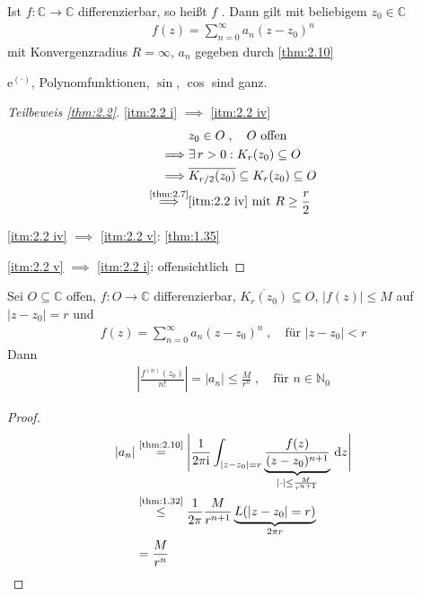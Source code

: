 \begin{theorem}[Definition] \label{thm:2.11}
  Ist $f:\mathbb{C} \to \mathbb{C}$ differenzierbar, so heißt $f$ . Dann gilt mit beliebigem $z_0 \in \mathbb{C}$
  \begin{align*}
    f(z) = \sum\limits_{n=0}^{\infty} a_n (z-z_0)^n
  \end{align*}
  mit Konvergenzradius $R = \infty$, $a_n$ gegeben durch \ref{thm:2.10}
\end{theorem}

\begin{example}
  $\mathrm{e}^{(\cdot)}$, Polynomfunktionen, $\sin$, $\cos$ sind ganz.
\end{example}

\begin{proof}[Teilbeweis \ref{thm:2.2}]
  \ref{itm:2.2 i} $\implies$ \ref{itm:2.2 iv}
  \begin{align*}
    & z_0 \in O \; , \quad O \text{ offen} \\
    \implies& \exists \, r > 0 : K_r(z_0) \subseteq O \\
    \implies& \overline{K_{r/2}(z_0)} \subseteq K_r(z_0) \subseteq O \\
    \overset{\text{\ref{thm:2.7}}}{\implies}& \text{\ref{itm:2.2 iv}} \text{ mit } R \geq \frac{r}{2}
  \end{align*}
  
  \ref{itm:2.2 iv} $\implies$ \ref{itm:2.2 v}: \ref{thm:1.35}
  
  \ref{itm:2.2 v} $\implies$ \ref{itm:2.2 i}: offensichtlich
\end{proof}

\begin{theorem} \label{thm:2.13}
  Sei $O \subseteq \mathbb{C}$ offen, $f:O \to \mathbb{C}$ differenzierbar, $\overline{K_r(z_0)} \subseteq O$, $|f(z)| \leq M$ auf $|z-z_0| = r$ und
  \begin{align*}
    f(z) = \sum\limits_{n=0}^{\infty} a_n (z-z_0)^n \; , \quad \text{für } |z-z_0| < r
  \end{align*}
  Dann
  \begin{align*}
    \left| \frac{f^{(n)}(z_0)}{n!} \right| = |a_n| \leq \frac{M}{r^n} \; , \quad \text{für } n \in \mathbb{N}_0
  \end{align*}
  
  \begin{proof}
    \begin{align*}
      |a_n| &\overset{\text{\ref{thm:2.10}}}{=} \Bigg| \frac{1}{2 \pi \mathrm{i}} \int_{|z-z_0| = r} \underbrace{\frac{f(z)}{(z-z_0)^{n+1}}}_{|\cdot| \leq \frac{M}{r^{n+1}}} \, \mathrm{d}z \Bigg| \\
      &\overset{\text{\ref{thm:1.32}}}{\leq} \frac{1}{2 \pi} \frac{M}{r^{n+1}} \underbrace{L(|z-z_0| = r)}_{2 \pi r} \\
      &= \frac{M}{r^n}
    \end{align*}
  \end{proof}
\end{theorem}

